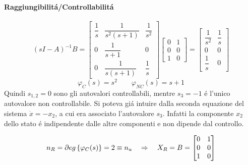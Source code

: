 \begin{mdframed}[style=Exercise]
\begin{Exercise}[title={Studio completo del sistema e stabilizzazione}, difficulty=3]
			\paragraph{Raggiungibilit\'a/Controllabilit\'a}
				\[
					(sI-A)^{-1}B =
					\begin{bmatrix}
						\dfrac{1}{s} & \dfrac{1}{s^2(s+1)} & \dfrac{1}{s^2}
						\\[1em]
						0 & \dfrac{1}{s+1} & 0
						\\[1em]
						0 & \dfrac{1}{s(s+1)} & \dfrac{1}{s}
					\end{bmatrix}
					\begin{bmatrix}
						0 & 1
						\\[1em]
						0 & 0
						\\[1em]
						1 & 0
					\end{bmatrix} =
					\begin{bmatrix}
						\dfrac{1}{s^2} & \dfrac{1}{s}
						\\[1em]
						0 & 0
						\\[1em]
						\dfrac{1}{s} & 0
					\end{bmatrix}
				\]
				\[
					\varphi_C(s) = s^2 \qquad \varphi_{NC}(s) = s+1
				\]
				Quindi $ s_{1,2} = 0 $ sono gli autovalori controllabili, mentre $ s_3 = -1 $ \'e l'unico autovalore non controllabile. Si poteva gi\'a intuire dalla seconda equazione del sistema $ \dot x = -x_2 $, a cui era associato l'autovalore $ s_3 $. Infatti la componente $ x_2 $ dello stato \'e indipendente dalle altre componenti e non dipende dal controllo.
				
				\[
					n_R = \partial eg \left\lbrace \varphi_C(s) \right\rbrace = 2 \equiv n_u \quad\Rightarrow\quad X_R = B =
					\begin{bmatrix}
						0 & 1\\
						0 & 0\\
						1 & 0
					\end{bmatrix}
				\]
				

\end{Exercise}
\end{mdframed}
